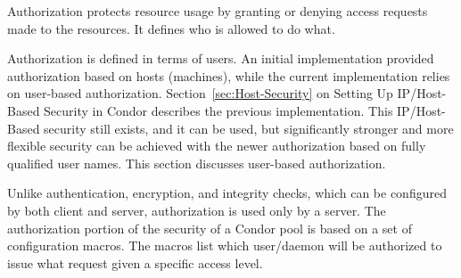 Authorization protects resource usage by granting or denying
access requests made to the resources.
It defines who is allowed to do what.

Authorization is defined in terms of users.
An initial implementation provided authorization
based on hosts (machines), while the current implementation
relies on user-based authorization.
Section~\ref{sec:Host-Security}
on Setting Up IP/Host-Based Security in Condor describes the
previous implementation.
This IP/Host-Based security still exists, and it can be used,
but significantly stronger and more flexible
security can be achieved with the newer
authorization based on fully qualified user names.
This section discusses user-based authorization. 


Unlike authentication, encryption, and integrity checks,
which can be configured by both client and server,
authorization is used only by a server.
The authorization portion of the security of a Condor pool is
based on a set of configuration macros.
The macros list which user/daemon will be authorized
to issue what request given a specific access level.


